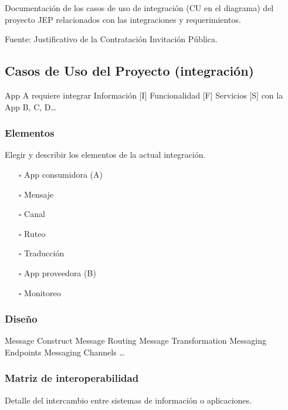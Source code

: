 \documentclass[
  paper=a4,
  ,captions=tableheading
]{scrartcl}
\providecommand{\tightlist}{%
  \setlength{\itemsep}{0pt}\setlength{\parskip}{0pt}}
\begin{document}
Documentación de los casos de uso de integración (CU en el diagrama) del
proyecto JEP relacionados con las integraciones y requerimientos.

Fuente: Justificativo de la Contratación Invitación Pública.

\subsection{Casos de Uso del Proyecto
(integración)}\label{sec:casos-de-uso-del-proyecto-integraciuxf3n}

App A requiere integrar Información {[}I{]} \textbar{} Funcionalidad
{[}F{]} \textbar{} Servicios {[}S{]} con la App B, C, D\ldots{}

\subsubsection{Elementos}\label{sec:elementos-4}

Elegir y describir los elementos de la actual integración.

\begin{itemize}
\tightlist
\item[$\square$]
  App consumidora (A)
\item[$\square$]
  Mensaje
\item[$\square$]
  Canal
\item[$\square$]
  Ruteo
\item[$\square$]
  Traducción
\item[$\square$]
  App proveedora (B)
\item[$\square$]
  Monitoreo
\end{itemize}

\subsubsection{Diseño}\label{sec:diseuxf1o-4}

Message Construct \textbar{} Message Routing \textbar{} Message
Transformation \textbar{} Messaging Endpoints \textbar{} Messaging
Channels \textbar{} \ldots{}

\subsubsection{Matriz de
interoperabilidad}\label{sec:matriz-de-interoperabilidad-4}

Detalle del intercambio entre sistemas de información o aplicaciones.
\end{document}
